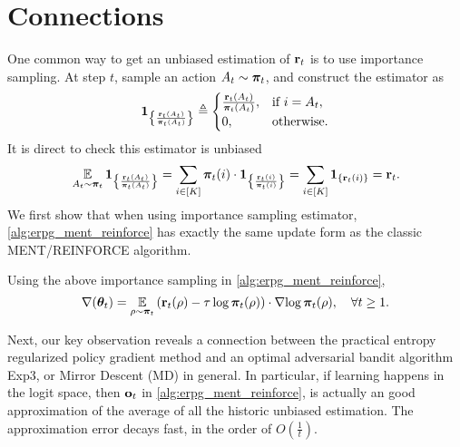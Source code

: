 \section{Connections}

One common way to get an unbiased estimation of ${\mathbf{r}}_t$ is to use importance sampling. At step $t$, sample an action $A_t \sim {\boldsymbol{\pi}}_t$, and construct the estimator as
\begin{equation*}
    {\mathbf{1}}_{ \left\{ \frac{{\mathbf{r}}_t(A_t) }{{\boldsymbol{\pi}}_t(A_t)}  \right\} } \triangleq \begin{cases}
		\frac{{\mathbf{r}}_t(A_t) }{{\boldsymbol{\pi}}_t(A_t)}, & \text{if } i = A_t, \\
		0, & \text{otherwise}.
		\end{cases}
\end{equation*}
It is direct to check this estimator is unbiased
\begin{equation*}
    \operatorname*{{\mathbb{E}}}\limits_{A_t \sim {\boldsymbol{\pi}}_t}{ {\mathbf{1}}_{ \left\{ \frac{{\mathbf{r}}_t(A_t) }{{\boldsymbol{\pi}}_t(A_t)}  \right\} } } = \sum\limits_{ i \in [K] }{ {\boldsymbol{\pi}}_t(i) \cdot {\mathbf{1}}_{ \left\{ \frac{{\mathbf{r}}_t(i) }{{\boldsymbol{\pi}}_t(i)}  \right\} }  } = \sum\limits_{i \in [K] }{ {\mathbf{1}}_{ \left\{ {\mathbf{r}}_t(i)  \right\} } } = {\mathbf{r}}_t.
\end{equation*}
We first show that when using importance sampling estimator, \cref{alg:erpg_ment_reinforce} has exactly the same update form as the classic MENT/REINFORCE algorithm.

\begin{lem}
\label{lem:equivalence_ment_reinforce}
Using the above importance sampling in \cref{alg:erpg_ment_reinforce},
\begin{equation*}
    \nabla{({\boldsymbol{\theta}}_t)} = \operatorname*{{\mathbb{E}}}\limits_{\rho \sim {\boldsymbol{\pi}}_t}{ \left( {\mathbf{r}}_t(\rho) - \tau \log{{\boldsymbol{\pi}}_t(\rho)} \right) \cdot \nabla{ \log{{\boldsymbol{\pi}}_t(\rho)} } }, \quad \forall t \ge 1.
\end{equation*}
\end{lem}

Next, our key observation reveals a connection between the practical entropy regularized policy gradient method and an optimal adversarial bandit algorithm Exp3, or Mirror Descent (MD) in general. In particular, if learning happens in the logit space, then ${\mathbf{o}}_t$ in \cref{alg:erpg_ment_reinforce}, is actually an good approximation of the average of all the historic unbiased estimation. The approximation error decays fast, in the order of $O\left( \frac{1}{t} \right)$.

